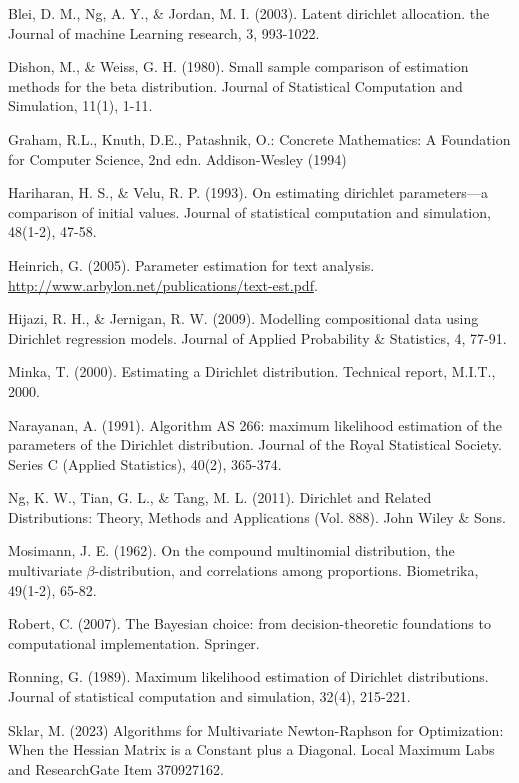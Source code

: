 \documentclass[twoside]{article}
\begin{document}
\begin{thebibliography}{20}

Blei, D. M., Ng, A. Y., \& Jordan, M. I. (2003). Latent dirichlet allocation. the Journal of machine Learning research, 3, 993-1022.

Dishon, M., \& Weiss, G. H. (1980). Small sample comparison of estimation methods for the beta distribution. Journal of Statistical Computation and Simulation, 11(1), 1-11.

Graham, R.L., Knuth, D.E., Patashnik, O.: Concrete Mathematics: A Foundation for Computer Science, 2nd edn. Addison-Wesley (1994)

Hariharan, H. S., \& Velu, R. P. (1993). On estimating dirichlet parameters—a comparison of initial values. Journal of statistical computation and simulation, 48(1-2), 47-58.

Heinrich, G. (2005). Parameter estimation for text analysis. \url{http://www.arbylon.net/publications/text-est.pdf}.

Hijazi, R. H., \& Jernigan, R. W. (2009). Modelling compositional data using Dirichlet regression models. Journal of Applied Probability \& Statistics, 4, 77-91.

Minka, T. (2000). Estimating a Dirichlet distribution. Technical report, M.I.T., 2000.

Narayanan, A. (1991). Algorithm AS 266: maximum likelihood estimation of the parameters of the Dirichlet distribution. Journal of the Royal Statistical Society. Series C (Applied Statistics), 40(2), 365-374.

Ng, K. W., Tian, G. L., \& Tang, M. L. (2011). Dirichlet and Related Distributions: Theory, Methods and Applications (Vol. 888). John Wiley \& Sons.

Mosimann, J. E. (1962). On the compound multinomial distribution, the multivariate \(\beta\)-distribution, and correlations among proportions. Biometrika, 49(1-2), 65-82.

Robert, C. (2007). The Bayesian choice: from decision-theoretic foundations to computational implementation. Springer.

Ronning, G. (1989). Maximum likelihood estimation of Dirichlet distributions. Journal of statistical computation and simulation, 32(4), 215-221.

Sklar, M. (2023) Algorithms for Multivariate Newton-Raphson for Optimization: When the Hessian Matrix is a Constant plus a Diagonal. Local Maximum Labs and ResearchGate Item 370927162.


\end{thebibliography}
\end{document}
